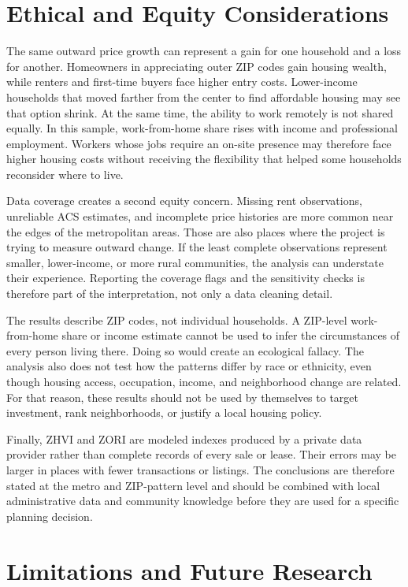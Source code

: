 \documentclass[11pt]{article}
\begin{document}
\section{Ethical and Equity Considerations}

The same outward price growth can represent a gain for one household and a loss for another. Homeowners in appreciating outer ZIP
codes gain housing wealth, while renters and first-time buyers face higher entry costs. Lower-income households that moved farther
from the center to find affordable housing may see that option shrink. At the same time, the ability to work remotely is not shared
equally. In this sample, work-from-home share rises with income and professional employment. Workers whose jobs require an on-site
presence may therefore face higher housing costs without receiving the flexibility that helped some households reconsider where to
live.

Data coverage creates a second equity concern. Missing rent observations, unreliable ACS estimates, and incomplete price histories
are more common near the edges of the metropolitan areas. Those are also places where the project is trying to measure outward
change. If the least complete observations represent smaller, lower-income, or more rural communities, the analysis can understate
their experience. Reporting the coverage flags and the sensitivity checks is therefore part of the interpretation, not only a data
cleaning detail.

The results describe ZIP codes, not individual households. A ZIP-level work-from-home share or income estimate cannot be used to
infer the circumstances of every person living there. Doing so would create an ecological fallacy. The analysis also does not test
how the patterns differ by race or ethnicity, even though housing access, occupation, income, and neighborhood change are related.
For that reason, these results should not be used by themselves to target investment, rank neighborhoods, or justify a local housing
policy.

Finally, ZHVI and ZORI are modeled indexes produced by a private data provider rather than complete records of every sale or lease.
Their errors may be larger in places with fewer transactions or listings. The conclusions are therefore stated at the metro and
ZIP-pattern level and should be combined with local administrative data and community knowledge before they are used for a specific
planning decision.

\section{Limitations and Future Research}
\end{document}
